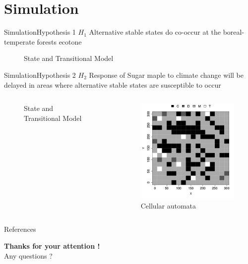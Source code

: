 \documentclass[table]{eecslides}
\begin{document}
\section{Simulation}

\begin{frame}{Simulation}{Hypothesis 1}
$H_1$ Alternative stable states do co-occur at the boreal-temperate forests ecotone
	\begin{figure}
		\caption*{State and Transitional Model}
		\small{}
	\end{figure}
\end{frame}

\begin{frame}{Simulation}{Hypothesis 2}
$H_2$ Response of Sugar maple to climate change will be delayed in areas where alternative stable states are susceptible to occur
\begin{columns}[c]
	\begin{column}[c]{.40\paperwidth}
		\begin{figure}
			\caption*{State and Transitional Model}
			\small{}
		\end{figure}
	\end{column}
	\begin{column}[l]{.40\paperwidth}
		\begin{figure}
			\caption*{Cellular automata}
			\includegraphics[width=.35\paperwidth]{Figs/Mat_automat.pdf}
		\end{figure}
	\end{column}
\end{columns}
\end{frame}


\begin{frame}[allowsframebreaks]{References}
	\scriptsize
	
	
\end{frame}

\begin{frame}[plain]
\large{	\textbf{\alert{Thanks for your attention !}}\\
	\vspace{2em}
	Any questions ?}
\end{frame}
\end{document}
